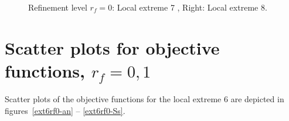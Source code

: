 \documentclass[review,times,3p,twocolumn,10pt]{elsarticle}
\begin{document}
\begin{figure}[htb!]
\label{rf0ex4}
\caption{Refinement level $r_f=0$: Local extreme 7 , Right: Local extreme 8.}
\end{figure}


\section{Scatter plots for objective functions, $r_f=0,1$}
 
 Scatter plots of the objective functions for the local extreme 6 are depicted in figures~\ref{ext6rf0-an} -- \ref{ext6rf0-Ss}.
 
\end{document}
